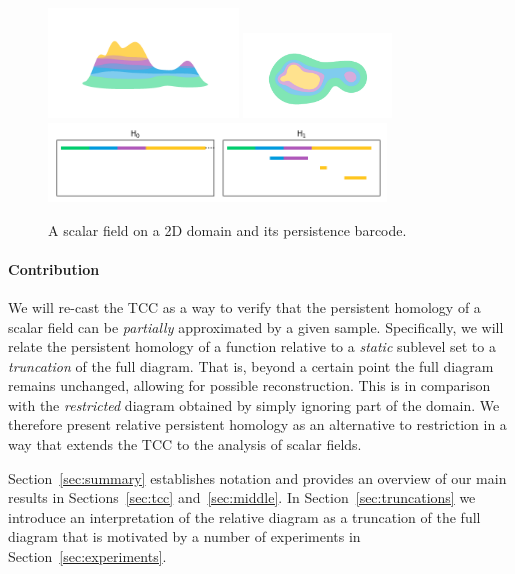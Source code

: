 
\begin{figure}[htbp]
  \centering
  \includegraphics[trim=200 200 200 200, clip, width=0.45\textwidth]{figures/surf-side.png}
  \includegraphics[trim=250 0 50 100, clip, width=0.35\textwidth]{figures/surf-top.png}
  \includegraphics[width=0.8\textwidth]{figures/scalar_barcode_true.png}
  \caption{A scalar field on a 2D domain and its persistence barcode.}
\end{figure}

\paragraph*{Contribution}

We will re-cast the TCC as a way to verify that the persistent homology of a scalar field can be \emph{partially} approximated by a given sample.
Specifically, we will relate the persistent homology of a function relative to a \emph{static} sublevel set to a \emph{truncation} of the full diagram.
That is, beyond a certain point the full diagram remains unchanged, allowing for possible reconstruction.
This is in comparison with the \emph{restricted} diagram obtained by simply ignoring part of the domain.
We therefore present relative persistent homology as an alternative to restriction in a way that extends the TCC to the analysis of scalar fields.

Section~\ref{sec:summary} establishes notation and provides an overview of our main results in Sections~\ref{sec:tcc} and~\ref{sec:middle}.
In Section~\ref{sec:truncations} we introduce an interpretation of the relative diagram as a truncation of the full diagram that is motivated by a number of experiments in Section~\ref{sec:experiments}.
